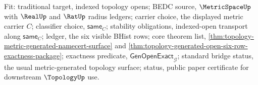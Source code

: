 Fit: traditional target, indexed topology opens; BEDC source, $\MetricSpaceUp$ with $\RealUp$ and $\RatUp$ radius ledgers; carrier choice, the displayed metric carrier $C$; classifier choice, $\mathsf{same}_C$; stability obligations, indexed-open transport along $\mathsf{same}_C$; ledger, the six visible BHist rows; core theorem list, \autoref{thm:topology-metric-generated-namecert-surface} and \autoref{thm:topology-generated-open-six-row-exactness-package}; exactness predicate, $\mathsf{GenOpenExact}_{\mathcal{G}}$; standard bridge status, the usual metric-generated topology surface; status, public paper certificate for downstream $\TopologyUp$ use.
